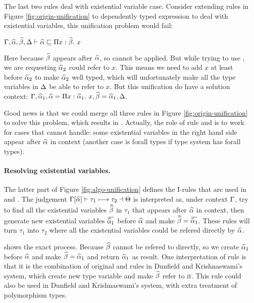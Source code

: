 The last two rules deal with existential variable case. Consider extending rules in Figure \ref{fig:origin-unification} to dependently typed expression to deal with existential variables, this unification problem would fail:

$\Gamma, \widehat{\alpha}, \widehat{\beta}, \Delta \vdash \widehat{\alpha} \sqsubseteq \Pi x:\widehat{\beta}.~ x$

Here because $\widehat{\beta}$ appears after $\widehat{\alpha}$, so  cannot be applied. But while trying to use , we are requesting $\widehat{\alpha}_2$ could refer to  $x$. This means we need to add $x$ at least before $\widehat{\alpha}_2$ to make $\widehat{\alpha}_2$ well typed, which will unfortunately make all the type variables in $\Delta$ be able to refer to $x$. But this unification do have a solution context: $\Gamma, \widehat{\alpha}_1, \widehat{\alpha} = \Pi x:\widehat{\alpha}_1.~ x, \widehat{\beta} = \widehat{\alpha}_1, \Delta$.

Good news is that we could merge all three rules in Figure \ref{fig:origin-unification} to solve this problem, which results in . Actually, the role of rule  and  is to work for cases that  cannot handle: some existential variables in the right hand side appear after $\widehat{\alpha}$ in context (another case is forall types if type system has forall types).

\paragraph{Resolving existential variables.} The latter part of Figure \ref{fig:algo-unification} defines the I-rules that are used in  and . The judgement $\Gamma[\widehat{\alpha}] \vdash \tau_1 \longmapsto \tau_2 \dashv \Theta$ is interpreted as, under context $\Gamma$, try to find all the existential variables $\overbar \genB$ in $\tau_1$ that appears after $\widehat{\alpha}$ in context, then generate new existential variables $\overbar {\genA_1}$ before $\widehat{\alpha}$ and make $\overbar \genB = \overbar {\genA_1}$. These rules will turn $\tau_1$ into $\tau_2$ where all the existential variables could be refered directly by $\widehat{\alpha}$.

 shows the exact process. Because $\widehat{\beta}$ cannot be refered to directly, so we create $\widehat{\alpha}_1$ before $\widehat{\alpha}$ and make $\widehat{\beta}=\widehat{\alpha}_1$ and return $\widehat{\alpha}_1$ as result. One interpretation of  rule is that it is the combination of original  and  rules in Dunfield and Krishnaswami's system, which create new type variable and make $\widehat{\beta}$ refer to it. This rule could also be used in Dunfield and Krishnaswami's system, with extra treatment of polymorphism types.


